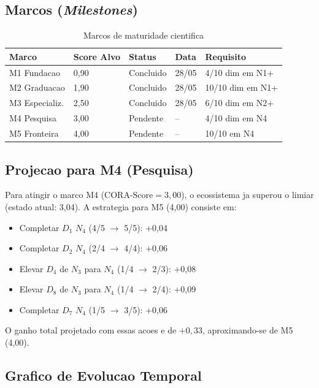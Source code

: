 \subsection{Marcos (\textit{Milestones})}

\begin{table}[H]\centering
\caption{Marcos de maturidade cientifica}
\begin{tabular}{@{}p{2.5cm}p{2.5cm}p{1.8cm}p{2.2cm}p{3.5cm}@{}}
\toprule
\textbf{Marco} & \textbf{Score Alvo} & \textbf{Status} & \textbf{Data} & \textbf{Requisito} \\
\midrule
M1 Fundacao & 0,90 & Concluido & 28/05 & 4/10 dim em N1+ \\
M2 Graduacao & 1,90 & Concluido & 28/05 & 10/10 dim em N1+ \\
M3 Especializ. & 2,50 & Concluido & 28/05 & 6/10 dim em N2+ \\
M4 Pesquisa & 3,00 & Pendente & -- & 4/10 dim em N4 \\
M5 Fronteira & 4,00 & Pendente & -- & 10/10 em N4 \\
\bottomrule
\end{tabular}
\end{table}

\subsection{Projecao para M4 (Pesquisa)}

Para atingir o marco M4 ($\text{CORA-Score} = 3,00$), o ecossistema ja superou o limiar
(estado atual: 3,04). A estrategia para M5 (4,00) consiste em:

\begin{itemize}
\item Completar $D_1$ $N_4$ (4/5 $\to$ 5/5): +0,04
\item Completar $D_2$ $N_4$ (2/4 $\to$ 4/4): +0,06
\item Elevar $D_4$ de $N_3$ para $N_4$ (1/4 $\to$ 2/3): +0,08
\item Elevar $D_8$ de $N_3$ para $N_4$ (1/4 $\to$ 2/4): +0,09
\item Completar $D_7$ $N_4$ (1/5 $\to$ 3/5): +0,06
\end{itemize}

O ganho total projetado com essas acoes e de $+0,33$, aproximando-se de M5 (4,00).

\subsection{Grafico de Evolucao Temporal}

